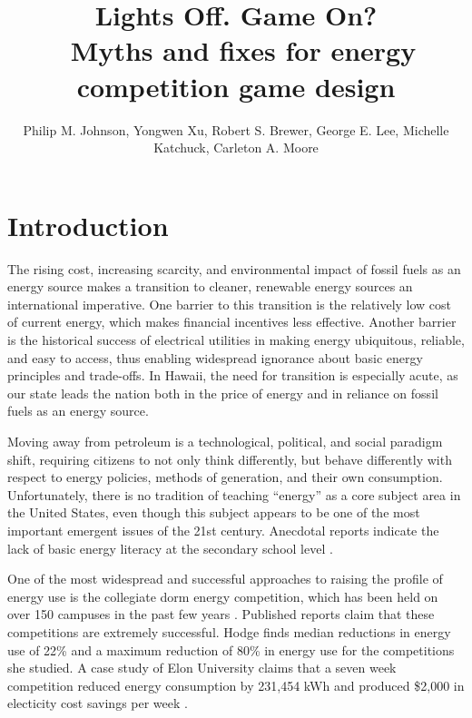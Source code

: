 \documentclass[jou]{apa} %
\title{Lights Off.  Game On? \\ \ 
       Myths and fixes for energy competition game design}
\author{Philip M. Johnson, Yongwen Xu, Robert S. Brewer, George E. Lee, Michelle Katchuck,
  Carleton A. Moore}
\affiliation{Collaborative Software Development Laboratory \\ Information and Computer
  Sciences \\ University of Hawaii \\ Honolulu, HI USA \\ johnson@hawaii.edu}
\begin{document}
\maketitle 

\section{Introduction}  

The rising cost, increasing scarcity, and environmental impact of fossil fuels as an
energy source makes a transition to cleaner, renewable energy sources an international
imperative.  One barrier to this transition is the relatively low cost of current energy,
which makes financial incentives less effective. Another barrier is the historical success
of electrical utilities in making energy ubiquitous, reliable, and easy to access, thus
enabling widespread ignorance about basic energy principles and trade-offs.  In Hawaii,
the need for transition is especially acute, as our state leads the nation both in the
price of energy and in reliance on fossil fuels as an energy source.

Moving away from petroleum is a technological, political, and social paradigm shift,
requiring citizens to not only think differently, but behave differently with respect to
energy policies, methods of generation, and their own consumption. Unfortunately, there is
no tradition of teaching ``energy'' as a core subject area in the United States, even
though this subject appears to be one of the most important emergent issues of the 21st
century. Anecdotal reports indicate the lack of basic energy literacy at the secondary
school level \cite{Ammons2010}.



One of the most widespread and successful approaches to raising the profile of energy use
is the collegiate dorm energy competition, which has been held on over 150 campuses in the
past few years \cite{Hodge2010}.  Published reports claim that these competitions are
extremely successful.  Hodge finds median reductions in energy use of 22\% and a maximum
reduction of 80\% in energy use for the competitions she studied. A case study of Elon
University claims that a seven week competition reduced energy consumption by 231,454 kWh
and produced \$2,000 in electicity cost savings per week \cite{Durr2010}.
\end{document}
